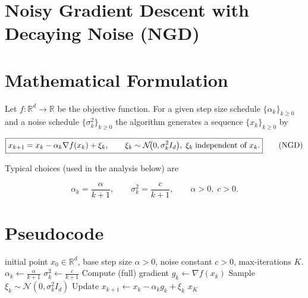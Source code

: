 \documentclass{article}
\newcommand{\R}{\mathbb{R}}
\begin{document}
\section*{Noisy Gradient Descent with Decaying Noise (NGD)}

\section*{Mathematical Formulation}
Let $f:\R^{d}\to\R$ be the objective function.  
For a given step size schedule $\{\alpha_k\}_{k\ge 0}$ and a noise schedule $\{\sigma_k^2\}_{k\ge 0}$ the algorithm generates a sequence $\{x_k\}_{k\ge 0}$ by  

\[
\boxed{%
x_{k+1}=x_k-\alpha_k \nabla f(x_k)+\xi_k,\qquad 
\xi_k\sim\mathcal N\!\big(0,\sigma_k^{2} I_d\big),\; \xi_k\;\text{independent of }x_k.}
\tag{NGD}
\]

Typical choices (used in the analysis below) are  

\[
\alpha_k=\frac{\alpha}{k+1},\qquad 
\sigma_k^{2}= \frac{c}{k+1},\qquad \alpha>0,\;c>0.
\]

\section*{Pseudocode}
\begin{algorithm}[H]
\caption{Noisy Gradient Descent with Decaying Noise}
\begin{algorithmic}[1]
 initial point $x_0\in\R^{d}$, base step size $\alpha>0$, noise constant $c>0$, max‑iterations $K$.
    \STATE $\displaystyle \alpha_k\gets \frac{\alpha}{k+1}$ 
    \STATE $\displaystyle \sigma_k^{2}\gets \frac{c}{k+1}$ 
    \STATE Compute (full) gradient $g_k\gets \nabla f(x_k)$
    \STATE Sample $\xi_k\sim \mathcal N(0,\sigma_k^{2}I_d)$
    \STATE Update $x_{k+1}\gets x_k-\alpha_k g_k+\xi_k$
\ENDFOR
{} $x_{K}$
\end{algorithmic}
\end{algorithm}
\end{document}
